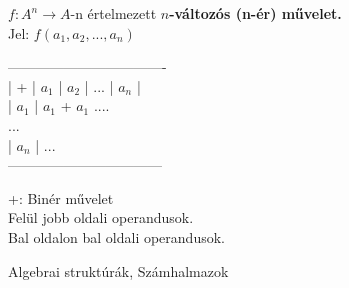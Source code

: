 \begin{frame}

\begin{tcolorbox}[title={Def.: $n$-változós művelet}]
$f : A^n \rightarrow A$-n értelmezett \textbf{$n$-változós (n-ér) művelet.}\\
Jel: $f(a_1, a_2, ..., a_n)$
\end{tcolorbox}

\begin{tcolorbox}[title={Def.: Műveleti tábla, Operandus}]
----------------------------------\\
|      +      |      $a_1$       |      $a_2$       | ... |      $a_n$      |\\
|    $a_1$    | $a_1$ + $a_1$ ....\\
...\\
| $a_n$ | ...\\
---------------------------------\\
\mmedskip

+: Binér művelet\\
Felül jobb oldali operandusok.\\
Bal oldalon bal oldali operandusok.
\end{tcolorbox}
\end{frame}


\begin{frame}[plain]
\begin{tcolorbox}[center, colback={myyellow}, coltext={black}, colframe={myyellow}]
    {\Huge Algebrai struktúrák, Számhalmazok}
    \mmedskip
\end{tcolorbox}
\end{frame}


